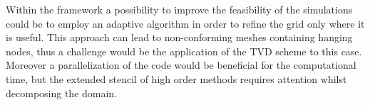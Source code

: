 Within the \DUMUX framework a possibility to improve the feasibility of the 
simulations could be to employ an adaptive algorithm in order to refine the grid 
only where it is useful. This approach can lead to non-conforming meshes 
containing hanging nodes, thus a challenge would be the application of the TVD 
scheme to this case. Moreover a parallelization of the code would be 
beneficial for the computational time, but the extended stencil of high order methods 
requires attention whilst decomposing the domain.